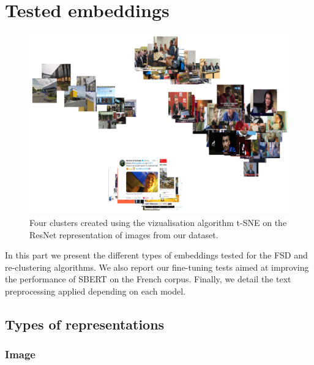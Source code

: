 \section{Tested embeddings}

\begin{figure}[h]
  \centering
  \includegraphics[width=\linewidth]{figures/four_image_clusters.png}
  \caption{Four clusters created using the vizualisation algorithm t-SNE on the ResNet representation of images from our dataset.}
  \label{Fig:t-SNE}
\end{figure}

In this part we present the different types of embeddings tested for the FSD and re-clustering algorithms. We also report our fine-tuning tests aimed at improving the performance of SBERT on the French corpus. Finally, we detail the text preprocessing applied depending on each model.


\subsection{Types of representations \label{SubSec: representations}}


\subsubsection{Image}

